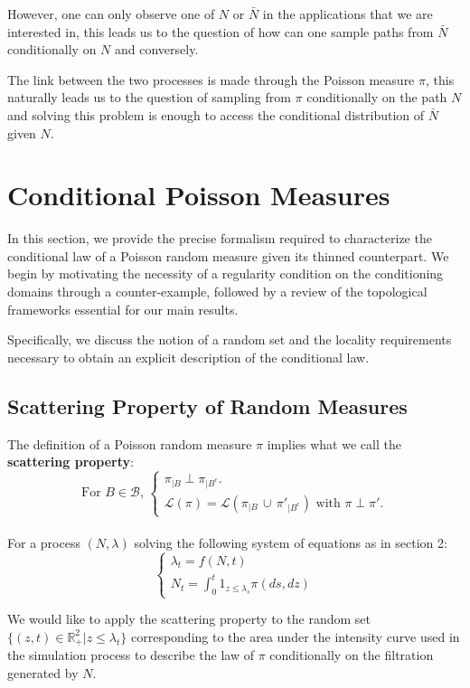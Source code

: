 \documentclass{article} %
\newcommand{\1}{\mathbbm{1}} %
\newcommand{\R}{\mathbb{R}}
\begin{document}
However, one can only observe one of $N$ or $\bar{N}$ in the applications that we are interested in, this leads us to the question of how can one sample paths from $\bar{N}$ conditionally on $N$ and conversely.

The link between the two processes is made through the Poisson measure $\pi$, this naturally leads us to the question of sampling from $\pi$ conditionally on the path $N$ and solving this problem is enough to access the conditional distribution of $\bar{N}$ given $N$.

\section{Conditional Poisson Measures}
\label{sec:conditional_measures}
In this section, we provide the precise formalism required to characterize the conditional law of a Poisson random measure given its thinned counterpart. We begin by motivating the necessity of a regularity condition on the conditioning domains through a counter-example, followed by a review of the topological frameworks essential for our main results. 

Specifically, we discuss the notion of a random set and the locality requirements necessary to obtain an explicit description of the conditional law.

\subsection{Scattering Property of Random Measures}

The definition of a Poisson random measure $\pi$ implies what we call the \textbf{scattering property}: 
    \[
    \text{For } B \in \mathcal{B}, \, 
    \begin{cases}
        \pi_{|B} \perp \pi_{|B^c}. \\
        \mathcal{L}(\pi) = \mathcal{L}(\pi_{|B} \,\cup \, \pi'_{|B^c}) \text{ with } \pi \perp \pi'.
    \end{cases}
    \]\\
For a process $(N, \lambda)$ solving the following system of equations as in section 2:
    \[
    \begin{cases}
    \lambda_t = f(N, t) \\
    N_t = \int_0^t 1_{z \leq \lambda_s} \pi(ds, dz)
    \end{cases}
    \]

We would like to apply the scattering property to the random set $\{ (z,t) \in \R_+^2 |z \leq \lambda_t \}$ corresponding to the area under the intensity curve used in the simulation process to describe the law of $\pi$ conditionally on the filtration generated by $N$.
\end{document}
